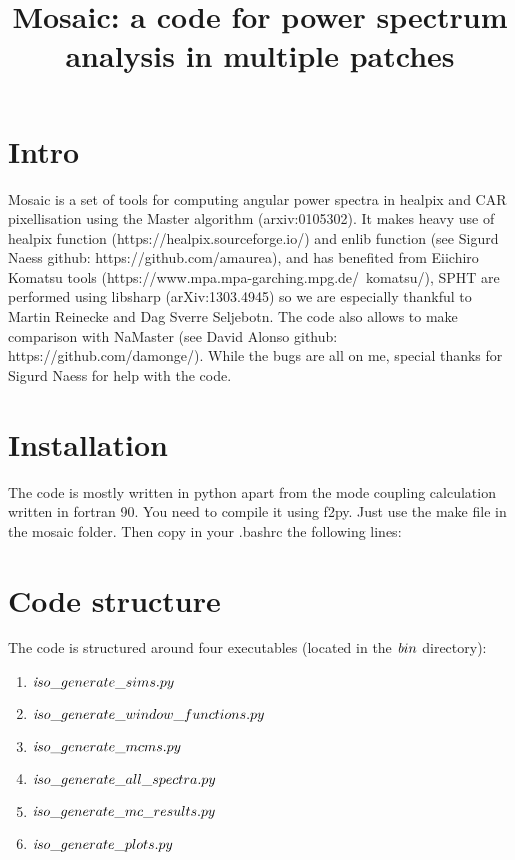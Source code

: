 \documentclass[a4paper, 11pt]{article}
\begin{document}
\title{Mosaic: a code for power spectrum analysis in multiple patches}
\maketitle

\section{Intro}

Mosaic is a set of tools for computing angular power spectra in healpix and CAR pixellisation using the Master algorithm (arxiv:0105302).
It makes heavy use of healpix function (https://healpix.sourceforge.io/) and enlib function (see Sigurd Naess github: https://github.com/amaurea), and has benefited from Eiichiro Komatsu tools (https://www.mpa.mpa-garching.mpg.de/~komatsu/), SPHT are performed using libsharp (arXiv:1303.4945) so we are especially thankful to Martin Reinecke and Dag Sverre Seljebotn.
The code also allows to make comparison with NaMaster (see David Alonso github: https://github.com/damonge/).
While the bugs are all on me, special thanks for Sigurd Naess for help with the code.

\section{Installation}

The code is mostly written in python apart from the mode coupling calculation written in fortran 90. You need to compile it using f2py. 
Just use the make file in the mosaic folder.
Then copy in your .bashrc the following lines:



\section{Code structure}

The code is structured around four executables (located in the ${\textit bin} $ directory): 
\begin{enumerate}
\item ${\textit  iso\_generate\_sims.py }$
\item ${\textit  iso\_generate\_window\_functions.py }$
\item ${\textit  iso\_generate\_mcms.py  }$
\item ${\textit  iso\_generate\_all\_spectra.py  }$
\item ${\textit  iso\_generate\_mc\_results.py  } $
\item ${\textit  iso\_generate\_plots.py  } $
\end{enumerate}
\end{document}

